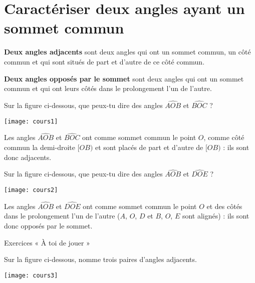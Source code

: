 
\section{Caractériser deux angles ayant un sommet commun}

\begin{aconnaitre}
\textbf{Deux angles adjacents} sont deux angles qui ont un sommet commun, un côté commun et qui sont situés de part et d'autre de ce côté commun.

\vspace{.5em}

\textbf{Deux angles opposés par le sommet} sont deux angles qui ont un sommet commun et qui ont leurs côtés dans le prolongement l'un de l'autre.
\end{aconnaitre}

\begin{exemple*1}

Sur la figure ci-dessous, que peux-tu dire des angles $\widehat{AOB}$ et $\widehat{BOC}$ ?

\begin{center}
    \texttt{[image: cours1]}
\end{center}

\correction
Les angles $\widehat{AOB}$ et $\widehat{BOC}$ ont comme sommet commun le point $O$, comme côté commun la demi-droite $[OB)$ et sont placés de part et d'autre de $[OB)$ : ils sont donc adjacents.
\end{exemple*1}


\begin{exemple*1}
Sur la figure ci-dessous, que peux-tu dire des angles $\widehat{AOB}$ et $\widehat{DOE}$ ?

\begin{center}
    \texttt{[image: cours2]}
\end{center}

\correction
Les angles $\widehat{AOB}$ et $\widehat{DOE}$ ont comme sommet commun le point $O$ et des côtés dans le prolongement l'un de l'autre ($A$, $O$, $D$ et $B$, $O$, $E$ sont alignés) : ils sont donc opposés par le sommet.
\end{exemple*1}

\vspace{1em}

Exercices « À toi de jouer »

Sur la figure ci-dessous, nomme trois paires d'angles adjacents.

\begin{center}
    \texttt{[image: cours3]}
\end{center}

